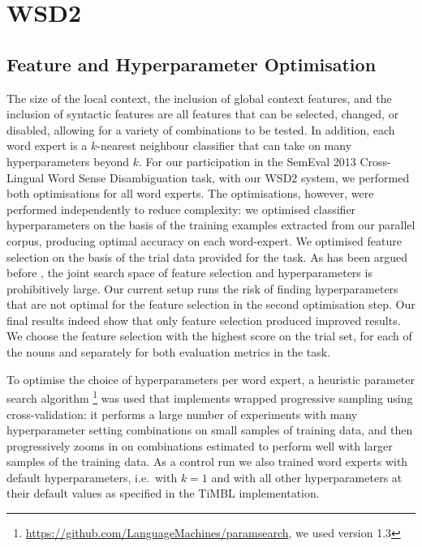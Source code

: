 \section{WSD2}
\label{sec:wsd2}

\subsection{Feature and Hyperparameter Optimisation}

The size of the local context, the inclusion of global context features, and
the inclusion of syntactic features are all features that can be selected,
changed, or disabled, allowing for a variety of combinations to be tested. In
addition, each word expert is a $k$-nearest neighbour classifier that can take
on many hyperparameters beyond $k$. For our participation in the SemEval 2013
Cross-Lingual Word Sense Disambiguation task, with our WSD2 system, we performed both
optimisations for all word experts. The optimisations, however, were performed
independently to reduce complexity: we optimised classifier hyperparameters on
the basis of the training examples extracted from our parallel corpus,
producing optimal accuracy on each word-expert. We optimised feature selection
on the basis of the trial data provided for the task. As has been argued before
\citep{Hoste+02}, the joint search space of feature selection and
hyperparameters is prohibitively large. Our current setup runs the risk of
finding hyperparameters that are not optimal for the feature selection in the
second optimisation step. Our final results indeed show that only feature
selection produced improved results. We choose the feature selection with the
highest score on the trial set, for each of the nouns and separately for both
evaluation metrics in the task.

To optimise the choice of hyperparameters per word expert, a heuristic
parameter search algorithm
\citep{PARAMSEARCH}\footnote{\url{https://github.com/LanguageMachines/paramsearch}, we used version 1.3} was used that
implements wrapped progressive sampling using cross-validation: it performs a
large number of experiments with many hyperparameter setting combinations on
small samples of training data, and then progressively zooms in on combinations
estimated to perform well with larger samples of the training data. As a
control run we also trained word experts with default hyperparameters, i.e.\
with $k=1$ and with all other hyperparameters at their default values as
specified in the TiMBL implementation.

